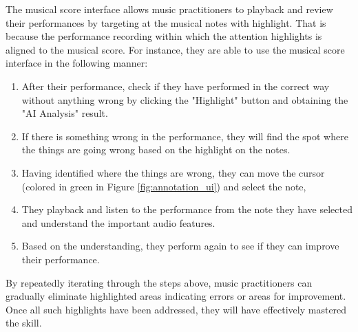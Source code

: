 \documentclass[sigconf,review,anonymous]{acmart}
\begin{document}
{%
The musical score interface allows music practitioners to playback and review their performances by targeting at the musical notes with highlight. That is because the performance recording within which the attention highlights is aligned to the musical score.
For instance, they are able to use the musical score interface in the following manner:
\begin{enumerate}
   \item After their performance, check if they have performed in the correct way without anything wrong by clicking the "Highlight" button and obtaining the "AI Analysis" result.
   \item If there is something wrong in the performance, they will find the spot where the things are going wrong based on the highlight on the notes.
   \item Having identified where the things are wrong, they can move the cursor (colored in green in Figure \ref{fig:annotation_ui}) and select the note,
   \item They playback and listen to the performance from the note they have selected and understand the important audio features.
   \item Based on the understanding, they perform again to see if they can improve their performance.
 \end{enumerate}
By repeatedly iterating through the steps above, music practitioners can gradually eliminate highlighted areas indicating errors or areas for improvement. 
Once all such highlights have been addressed, they will have effectively mastered the skill.

}
\end{document}
